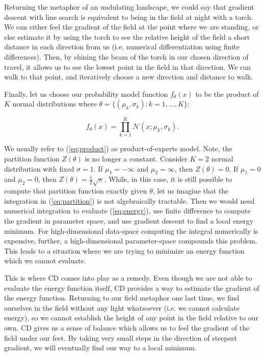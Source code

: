 \documentclass[11pt]{article}
\begin{document}
Returning the metaphor of an undulating landscape, we could say that gradient descent with line search is equivalent to being in the field at night with a torch. We can either feel the gradient of the field at the point where we are standing, or else estimate it by using the torch to see the relative height of the field a short distance in each direction from us (i.e. numerical differentiation using finite differences). Then, by shining the beam of the torch in our chosen direction of travel, it allows us to see the lowest point in the field in that direction. We can walk to that point, and iteratively choose a new direction and distance to walk.

Finally, let us choose our probability model function $f_\theta(x)$ to be the product of $K$ normal distributions where $\theta = \{(\mu_k, \sigma_k) : k=1,\ldots,K \}$:

\begin{equation}
f_\theta(x) = \prod_{k=1}^K \mathcal{N}(x; \mu_k, \sigma_k).
\label{eq:product}
\end{equation}

We usually refer to (\ref{eq:product}) as product-of-experts model. Note, the partition function $Z(\theta)$ is no longer a constant. Consider $K=2$ normal distribution with fixed $\sigma=1$. If $\mu_1=-\infty$ and $\mu_2=\infty$, then $Z(\theta) = 0$. If $\mu_1=0$ and $\mu_2=0$, then $Z(\theta) = \frac{1}{2}\sqrt{\pi}$. While, in this case, it is still possible to compute that partition function exactly given $\theta$, let us imagine that the integration in (\ref{eq:partition}) is not algebraically tractable. Then we would need numerical integration to evaluate (\ref{eq:energy}), use finite difference to compute the gradient in parameter space, and use gradient descent to find a local energy minimum. For high-dimensional data-space computing the integral numerically is expensive, further, a high-dimensional parameter-space compounds this problem. This leads to a situation where we are trying to minimize an energy function which we cannot evaluate.

This is where CD comes into play as a remedy. Even though we are not able to evaluate the energy function itself, CD provides a way to estimate the gradient of the energy function. Returning to our field metaphor one last time, we find ourselves in the field without any light whatsoever (i.e. we cannot calculate energy), so we cannot establish the height of any point in the field relative to our own. CD gives us a sense of balance which allows us to feel the gradient of the field under our feet. By taking very small steps in the direction of steepest gradient, we will eventually find our way to a local minimum.
\end{document}
